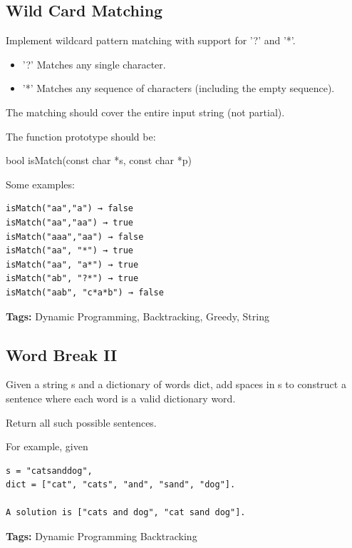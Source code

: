 \documentclass[11pt]{book}
\begin{document}
\subsection{Wild Card Matching}
\label{sec-16-4-11}
Implement wildcard pattern matching with support for '?' and '*'.
\begin{itemize}
\item '?' Matches any single character.
\item '*' Matches any sequence of characters (including the empty sequence).
\end{itemize}

The matching should cover the entire input string (not partial).

The function prototype should be:

bool isMatch(const char *s, const char *p)

Some examples:
\lstset{language=java,label= ,caption= ,numbers=none}
\begin{lstlisting}
isMatch("aa","a") → false
isMatch("aa","aa") → true
isMatch("aaa","aa") → false
isMatch("aa", "*") → true
isMatch("aa", "a*") → true
isMatch("ab", "?*") → true
isMatch("aab", "c*a*b") → false
\end{lstlisting}
\textbf{Tags:} Dynamic Programming, Backtracking, Greedy, String
\subsection{Word Break II}
\label{sec-16-4-12}
Given a string s and a dictionary of words dict, add spaces in s to construct a sentence where each word is a valid dictionary word.

Return all such possible sentences.

For example, given
\lstset{language=java,label= ,caption= ,numbers=none}
\begin{lstlisting}
s = "catsanddog",
dict = ["cat", "cats", "and", "sand", "dog"].

A solution is ["cats and dog", "cat sand dog"].
\end{lstlisting}
\textbf{Tags:} Dynamic Programming Backtracking
\end{document}
